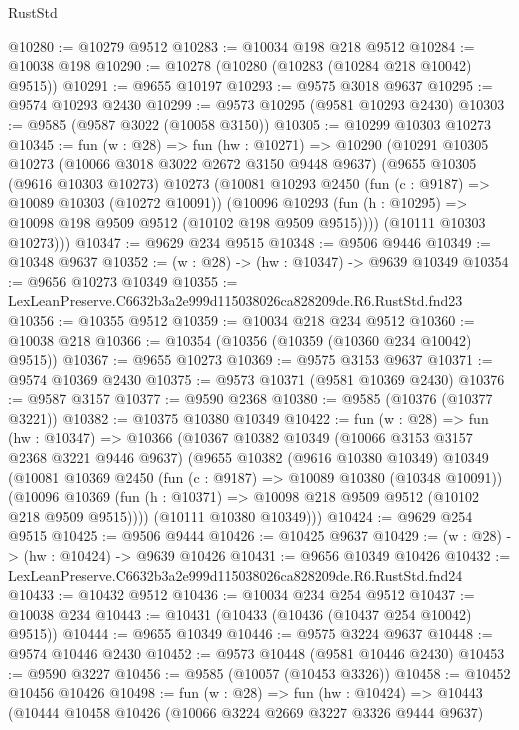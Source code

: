\begin{lexlean}{RustStd}
\begin{coremodule}
@10280 := @10279 @9512
@10283 := @10034 @198 @218 @9512
@10284 := @10038 @198
@10290 := @10278 (@10280 (@10283 (@10284 @218 @10042) @9515))
@10291 := @9655 @10197
@10293 := @9575 @3018 @9637
@10295 := @9574 @10293 @2430
@10299 := @9573 @10295 (@9581 @10293 @2430)
@10303 := @9585 (@9587 @3022 (@10058 @3150))
@10305 := @10299 @10303 @10273
@10345 := fun (w : @28) =>
  fun (hw : @10271) =>
  @10290
    (@10291
      @10305
      @10273
      (@10066 @3018 @3022 @2672 @3150 @9448 @9637)
      (@9655
        @10305
        (@9616 @10303 @10273)
        @10273
        (@10081
          @10293
          @2450
          (fun (c : @9187) => @10089 @10303 (@10272 @10091))
          (@10096 @10293 (fun (h : @10295) => @10098 @198 @9509 @9512 (@10102 @198 @9509 @9515))))
        (@10111 @10303 @10273)))
@10347 := @9629 @234 @9515
@10348 := @9506 @9446
@10349 := @10348 @9637
@10352 := (w : @28) -> (hw : @10347) -> @9639 @10349
@10354 := @9656 @10273 @10349
@10355 := LexLeanPreserve.C6632b3a2e999d115038026ca828209de.R6.RustStd.fnd23
@10356 := @10355 @9512
@10359 := @10034 @218 @234 @9512
@10360 := @10038 @218
@10366 := @10354 (@10356 (@10359 (@10360 @234 @10042) @9515))
@10367 := @9655 @10273
@10369 := @9575 @3153 @9637
@10371 := @9574 @10369 @2430
@10375 := @9573 @10371 (@9581 @10369 @2430)
@10376 := @9587 @3157
@10377 := @9590 @2368
@10380 := @9585 (@10376 (@10377 @3221))
@10382 := @10375 @10380 @10349
@10422 := fun (w : @28) =>
  fun (hw : @10347) =>
  @10366
    (@10367
      @10382
      @10349
      (@10066 @3153 @3157 @2368 @3221 @9446 @9637)
      (@9655
        @10382
        (@9616 @10380 @10349)
        @10349
        (@10081
          @10369
          @2450
          (fun (c : @9187) => @10089 @10380 (@10348 @10091))
          (@10096 @10369 (fun (h : @10371) => @10098 @218 @9509 @9512 (@10102 @218 @9509 @9515))))
        (@10111 @10380 @10349)))
@10424 := @9629 @254 @9515
@10425 := @9506 @9444
@10426 := @10425 @9637
@10429 := (w : @28) -> (hw : @10424) -> @9639 @10426
@10431 := @9656 @10349 @10426
@10432 := LexLeanPreserve.C6632b3a2e999d115038026ca828209de.R6.RustStd.fnd24
@10433 := @10432 @9512
@10436 := @10034 @234 @254 @9512
@10437 := @10038 @234
@10443 := @10431 (@10433 (@10436 (@10437 @254 @10042) @9515))
@10444 := @9655 @10349
@10446 := @9575 @3224 @9637
@10448 := @9574 @10446 @2430
@10452 := @9573 @10448 (@9581 @10446 @2430)
@10453 := @9590 @3227
@10456 := @9585 (@10057 (@10453 @3326))
@10458 := @10452 @10456 @10426
@10498 := fun (w : @28) =>
  fun (hw : @10424) =>
  @10443
    (@10444
      @10458
      @10426
      (@10066 @3224 @2669 @3227 @3326 @9444 @9637)

\end{coremodule}
\end{lexlean}

